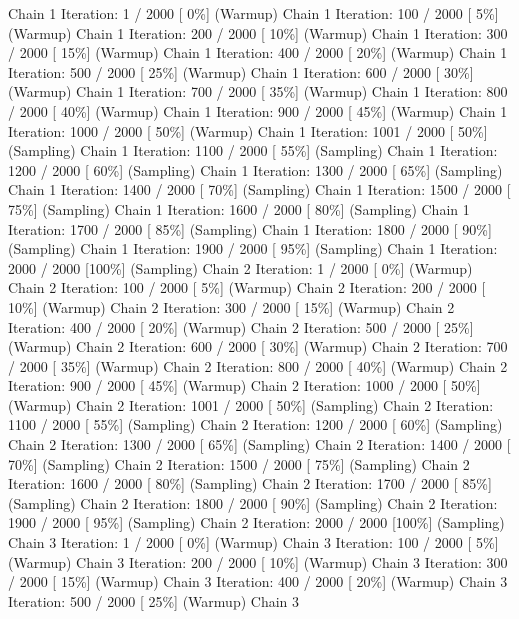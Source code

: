 \documentclass[
]{article}
\begin{document}
Chain 1 Iteration: 1 / 2000 {[} 0\%{]} (Warmup) Chain 1 Iteration: 100 /
2000 {[} 5\%{]} (Warmup) Chain 1 Iteration: 200 / 2000 {[} 10\%{]}
(Warmup) Chain 1 Iteration: 300 / 2000 {[} 15\%{]} (Warmup) Chain 1
Iteration: 400 / 2000 {[} 20\%{]} (Warmup) Chain 1 Iteration: 500 / 2000
{[} 25\%{]} (Warmup) Chain 1 Iteration: 600 / 2000 {[} 30\%{]} (Warmup)
Chain 1 Iteration: 700 / 2000 {[} 35\%{]} (Warmup) Chain 1 Iteration:
800 / 2000 {[} 40\%{]} (Warmup) Chain 1 Iteration: 900 / 2000 {[}
45\%{]} (Warmup) Chain 1 Iteration: 1000 / 2000 {[} 50\%{]} (Warmup)
Chain 1 Iteration: 1001 / 2000 {[} 50\%{]} (Sampling) Chain 1 Iteration:
1100 / 2000 {[} 55\%{]} (Sampling) Chain 1 Iteration: 1200 / 2000 {[}
60\%{]} (Sampling) Chain 1 Iteration: 1300 / 2000 {[} 65\%{]} (Sampling)
Chain 1 Iteration: 1400 / 2000 {[} 70\%{]} (Sampling) Chain 1 Iteration:
1500 / 2000 {[} 75\%{]} (Sampling) Chain 1 Iteration: 1600 / 2000 {[}
80\%{]} (Sampling) Chain 1 Iteration: 1700 / 2000 {[} 85\%{]} (Sampling)
Chain 1 Iteration: 1800 / 2000 {[} 90\%{]} (Sampling) Chain 1 Iteration:
1900 / 2000 {[} 95\%{]} (Sampling) Chain 1 Iteration: 2000 / 2000
{[}100\%{]} (Sampling) Chain 2 Iteration: 1 / 2000 {[} 0\%{]} (Warmup)
Chain 2 Iteration: 100 / 2000 {[} 5\%{]} (Warmup) Chain 2 Iteration: 200
/ 2000 {[} 10\%{]} (Warmup) Chain 2 Iteration: 300 / 2000 {[} 15\%{]}
(Warmup) Chain 2 Iteration: 400 / 2000 {[} 20\%{]} (Warmup) Chain 2
Iteration: 500 / 2000 {[} 25\%{]} (Warmup) Chain 2 Iteration: 600 / 2000
{[} 30\%{]} (Warmup) Chain 2 Iteration: 700 / 2000 {[} 35\%{]} (Warmup)
Chain 2 Iteration: 800 / 2000 {[} 40\%{]} (Warmup) Chain 2 Iteration:
900 / 2000 {[} 45\%{]} (Warmup) Chain 2 Iteration: 1000 / 2000 {[}
50\%{]} (Warmup) Chain 2 Iteration: 1001 / 2000 {[} 50\%{]} (Sampling)
Chain 2 Iteration: 1100 / 2000 {[} 55\%{]} (Sampling) Chain 2 Iteration:
1200 / 2000 {[} 60\%{]} (Sampling) Chain 2 Iteration: 1300 / 2000 {[}
65\%{]} (Sampling) Chain 2 Iteration: 1400 / 2000 {[} 70\%{]} (Sampling)
Chain 2 Iteration: 1500 / 2000 {[} 75\%{]} (Sampling) Chain 2 Iteration:
1600 / 2000 {[} 80\%{]} (Sampling) Chain 2 Iteration: 1700 / 2000 {[}
85\%{]} (Sampling) Chain 2 Iteration: 1800 / 2000 {[} 90\%{]} (Sampling)
Chain 2 Iteration: 1900 / 2000 {[} 95\%{]} (Sampling) Chain 2 Iteration:
2000 / 2000 {[}100\%{]} (Sampling) Chain 3 Iteration: 1 / 2000 {[}
0\%{]} (Warmup) Chain 3 Iteration: 100 / 2000 {[} 5\%{]} (Warmup) Chain
3 Iteration: 200 / 2000 {[} 10\%{]} (Warmup) Chain 3 Iteration: 300 /
2000 {[} 15\%{]} (Warmup) Chain 3 Iteration: 400 / 2000 {[} 20\%{]}
(Warmup) Chain 3 Iteration: 500 / 2000 {[} 25\%{]} (Warmup) Chain 3
\end{document}
